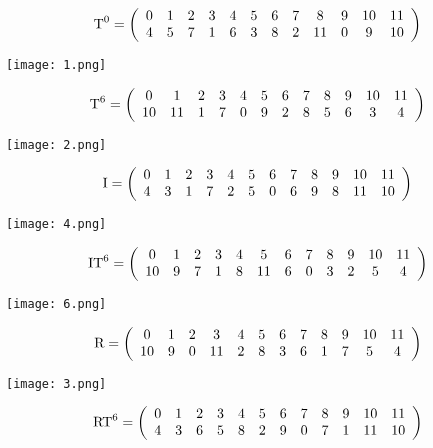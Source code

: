 	
	\[\mbox{T}^0=\left(\begin{array}{*{12}c}0&1&2&3&4&5&6&7&8&9&10&11\\4&5&7&1&6&3&8&2&11&0&9&10\\\end{array}\right)\]
	\begin{center}
		\texttt{[image: 1.png]}
	\end{center}
	\bigskip\bigskip
	\[\mbox{T}^6=\left(\begin{array}{*{12}c}0&1&2&3&4&5&6&7&8&9&10&11\\10&11&1&7&0&9&2&8&5&6&3&4\\\end{array}\right)\]
	\begin{center}
		\texttt{[image: 2.png]}
	\end{center}
	\bigskip\bigskip
	\[\mbox{I}=\left(\begin{array}{*{12}c}0&1&2&3&4&5&6&7&8&9&10&11\\4&3&1&7&2&5&0&6&9&8&11&10\\\end{array}\right)\]
	\begin{center}
		\texttt{[image: 4.png]}
	\end{center}
	\bigskip\bigskip
	\[\mbox{IT}^6=\left(\begin{array}{*{12}c}0&1&2&3&4&5&6&7&8&9&10&11\\10&9&7&1&8&11&6&0&3&2&5&4\\\end{array}\right)\]
	\begin{center}
		\texttt{[image: 6.png]}
	\end{center}
\bigskip\bigskip
	\[\mbox{R}=\left(\begin{array}{*{12}c}0&1&2&3&4&5&6&7&8&9&10&11\\10&9&0&11&2&8&3&6&1&7&5&4\\\end{array}\right)\]
	\begin{center}
		\texttt{[image: 3.png]}
	\end{center}
	\bigskip\bigskip
	\[\mbox{RT}^6=\left(\begin{array}{*{12}c}0&1&2&3&4&5&6&7&8&9&10&11\\4&3&6&5&8&2&9&0&7&1&11&10\\\end{array}\right)\]
